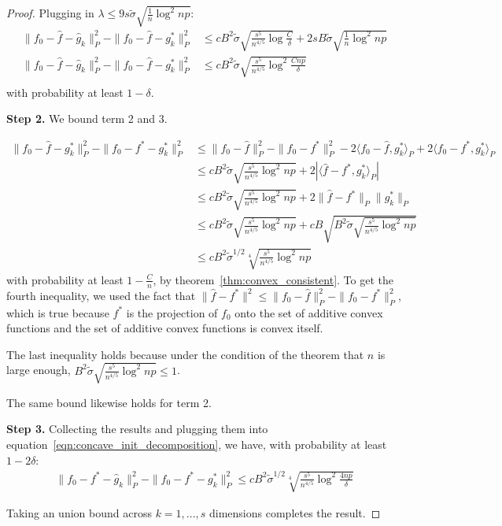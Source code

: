 \begin{proof}
Plugging in $\lambda \leq 9 s \tilde{\sigma} \sqrt{ \frac{1}{n} \log^2 np}$:
\begin{align*}
\| f_0 - \hat{f} - \hat{g}_k \|_P^2 - \|f_0 - \hat{f} - g^*_k \|_P^2 &
\leq c B^2 \tilde{\sigma} \sqrt{\frac{s^5}{n^{4/5}} \log \frac{C}{\delta}}+ 
    2s B \tilde{\sigma} \sqrt{\frac{1}{n} \log^2 np}\\
\| f_0 - \hat{f} - \hat{g}_k \|_P^2 - \|f_0 - \hat{f} - g^*_k \|_P^2 &
\leq c B^2 \tilde{\sigma} \sqrt{\frac{s^5}{n^{4/5}} \log^2 \frac{Cnp}{\delta}} \\
\end{align*}
with probability at least $1-\delta$.

\textbf{Step 2.} We bound term 2 and 3.

\begin{align*}
\| f_0 - \hat{f} - g^*_k \|_P^2 - \| f_0 - f^* - g^*_k\|_P^2 &\leq 
    \| f_0 - \hat{f} \|_P^2 - \|f_0 - f^*\|_P^2 - 2\langle f_0 - \hat{f}, g^*_k \rangle_P
   + 2 \langle f_0 - f^*, g^*_k \rangle_P \\
 &\leq c B^2 \tilde{\sigma} \sqrt{ \frac{s^5}{n^{4/5}} \log^2 np} + 
    2 | \langle \hat{f} - f^*, g^*_k \rangle_P |  \\
 &\leq  c B^2 \tilde{\sigma} \sqrt{ \frac{s^5}{n^{4/5}} \log^2 np} +
    2 \| \hat{f} - f^* \|_P \| g^*_k \|_P \\
&\leq  c B^2 \tilde{\sigma} \sqrt{ \frac{s^5}{n^{4/5}} \log^2 np} +
   c B \sqrt{B^2 \tilde{\sigma} \sqrt{ 
                   \frac{s^5}{n^{4/5}} \log^2 np} }\\
&\leq  cB^2 \tilde{\sigma}^{1/2} \sqrt[4]{ 
                   \frac{s^5}{n^{4/5}} \log^2 np} 
\end{align*}
with probability at least $1-\frac{C}{n}$, by theorem~\ref{thm:convex_consistent}. To get the fourth inequality, we used the fact that $\| \hat{f} - f^* \|^2 \leq \| f_0 - \hat{f} \|_P^2 - \|f_0 - f^*\|_P^2$, which is true because $f^*$ is the projection of $f_0$ onto the set of additive convex functions and the set of additive convex functions is convex itself. 

The last inequality holds because under the condition of the theorem that $n$ is large enough, $B^2 \tilde{\sigma} \sqrt{ \frac{s^5}{n^{4/5}} \log^2 np} \leq 1$.

The same bound likewise holds for term 2.

\textbf{Step 3.} Collecting the results and plugging them into equation~\ref{eqn:concave_init_decomposition}, we have, with probability at least $1-2\delta$:
\begin{align*}
\| f_0 - f^* - \hat{g}_k \|_P^2 - \|f_0 - f^* - g^*_k \|_P^2 \leq
   c B^2 \tilde{\sigma}^{1/2} 
     \sqrt[4]{ \frac{s^5}{n^{4/5}} \log^2 \frac{4np}{\delta}} 
\end{align*}

Taking an union bound across $k=1,...,s$ dimensions completes the result.

\end{proof}








